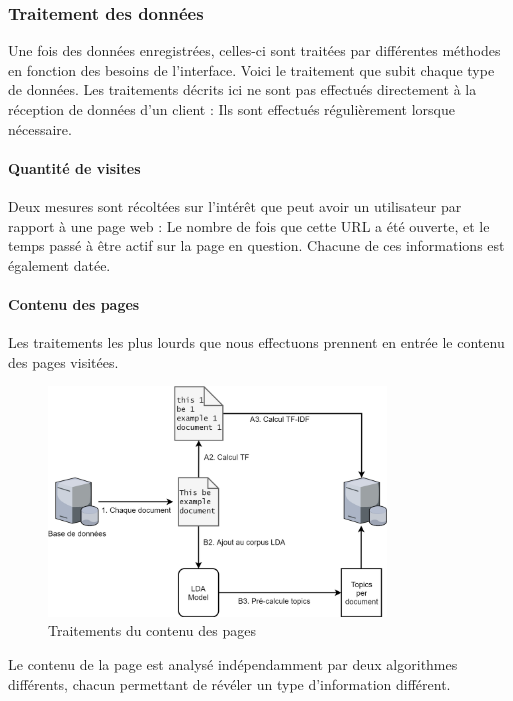 		\subsubsection{Traitement des données}

			Une fois des données enregistrées, celles-ci sont traitées par différentes méthodes en fonction des besoins de l'interface. Voici le traitement que subit chaque type de données. Les traitements décrits ici ne sont pas effectués directement à la réception de données d'un client : Ils sont effectués régulièrement lorsque nécessaire.

			\paragraph{Quantité de visites}

				Deux mesures sont récoltées sur l'intérêt que peut avoir un utilisateur par rapport à une page web : Le nombre de fois que cette URL a été ouverte, et le temps passé à être actif sur la page en question. Chacune de ces informations est également datée.

			\paragraph{Contenu des pages}

				Les traitements les plus lourds que nous effectuons prennent en entrée le contenu des pages visitées.

				\begin{figure}[!h]
					\centering
					\includegraphics[width=0.8\textwidth]{images/design/traitement_offline}
					\caption{Traitements du contenu des pages}
					\label{d-traitements}
				\end{figure}

				Le contenu de la page est analysé indépendamment par deux algorithmes différents, chacun permettant de révéler un type d'information différent.

